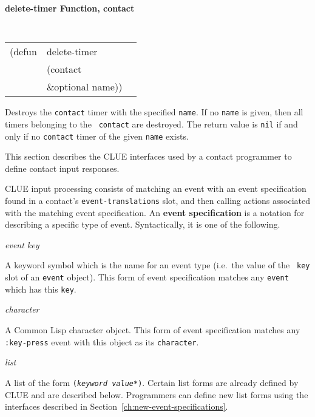 {\large {\bf delete-timer \hfill Function, contact}} 
\begin{flushright} \parbox[t]{6.125in}{
\tt
\begin{tabular}{lll}
\raggedright
(defun & delete-timer & \\ 
& (contact\\ 
& \&optional name))
\end{tabular}
\rm

}\end{flushright}

\begin{flushright} \parbox[t]{6.125in}{Destroys the {\tt contact} timer
with the specified {\tt name}. If no {\tt name} is given, then all timers
belonging to the {\tt
contact} are destroyed. The return value is {\tt nil} if and
only if no {\tt contact} timer of the given {\tt name} exists.

\rm

}\end{flushright}

{\samepage
{}
This section describes the CLUE interfaces used by a contact programmer to
define contact input responses.

CLUE input processing consists of matching an event with an event specification
found in a contact's {\tt event-translations} slot, and then calling actions
associated with the matching event specification.
An {\bf event specification} is a notation for
describing a specific type of event. Syntactically, it is one of the
following.
}

\parbox[t]{.75in}{{\em event key}}\parbox[t]{5.75in}{
A keyword symbol which is the name for an event type (i.e.\ the value of the {\tt
key} slot of an {\tt event} object). This form of event specification
matches any {\tt event} which has this {\tt key}.} 

\parbox[t]{.75in}{{\em character}}\parbox[t]{5.75in}{
A Common Lisp character object. This form of event specification matches any
{\tt :key-press} event with this object as its {\tt character}.}

\parbox[t]{.75in}{{\em list}}\parbox[t]{5.75in}{
A list of the form {\tt ({\em keyword} {\em value}*)}. Certain list forms are
already defined by CLUE and are described below. Programmers can define new list
forms using the interfaces described in
Section~\ref{ch:new-event-specifications}.}

